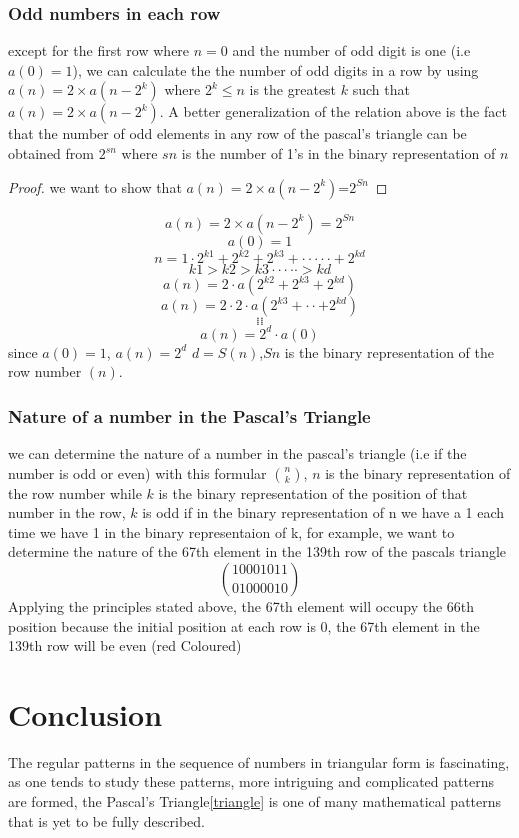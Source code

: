 \documentclass[10pt,a4paper]{article}
\newtheorem{proof}[theorem]{proof}
\begin{document}
\subsubsection{Odd numbers in each row}
except for the first row where $n=0$ and the number of odd digit is one  (i.e $a(0)=1$),  we can calculate the the number of odd digits in a row by using $a(n)=2\times a(n-2^k)$ where $2^{k}\leq n$ is the greatest $k$ such that $a(n)=2\times a(n-2^k)$. A better generalization of the relation above is the fact that the number of odd elements in any row of the pascal's triangle can be obtained from $2^{sn}$ where $sn$ is the number of 1's in  the binary representation of $n$

\begin{proof}
we want to show that $a(n)=2\times a(n-2^k)$=$2^{Sn}$ 
\end{proof}
$$a(n)=2\times a(n-2^k)=2^{Sn}$$
$$a(0)=1$$
$$n=1\cdot2^{k1}+2^{k2}+2^{k3}+\cdot\cdot\cdot\cdot\cdot+2^{kd}$$   $$ k1>k2>k3\cdot\cdot\cdot\cdot\cdot>kd$$
$$a(n)=2\cdot a(2^{k2}+2^{k3}+2^{kd})$$
$$a(n)=2\cdot2\cdot a(2^{k3}+\cdot\cdot+2^{kd})$$
$$.     .$$
$$.     .$$
$$.     .$$ 
$$.      .$$
$$a(n)=2^{d}\cdot a(0)$$
since $a(0)=1$, $a(n)=2^{d}$ $d=S(n)$,$Sn$ is the binary representation of the row number $(n)$.

\subsubsection{Nature of a number in the Pascal's Triangle}
we can determine the nature of a number in the pascal's triangle (i.e if the number is odd or even) with this formular $\binom{n}{k}$, $n$ is the binary representation of the row number while $k$ is the binary representation of the position of that number in the row, $k$ is odd if in the binary representation of n we have a 1 each time we have 1 in the binary representaion of k, for example, we  want to determine the nature of the 67th element in the 139th row of the pascals triangle
$$\binom{10001011}{01000010}$$ 
Applying the principles stated above, the 67th element will occupy the 66th position because the initial position at each row is 0,  the 67th element in the 139th row will be even (red Coloured)
\section{Conclusion}
The regular patterns in the sequence of numbers  in triangular form is fascinating, as one tends to study these patterns, more intriguing and complicated patterns are formed, the Pascal's Triangle\ref{triangle} is one of many mathematical patterns that is yet to be fully described.


\end{document}
